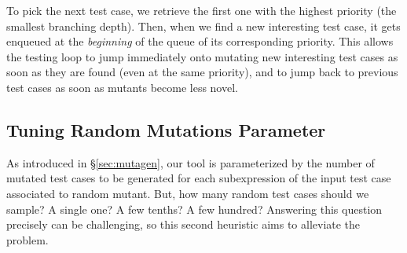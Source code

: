 \documentclass[sigconf,review,anonymous]{acmart}
\newcommand{\mutagen}{\textsc{Mutagen}\xspace}
\begin{document}
To pick the next test case, we retrieve the first one with the highest priority
(the smallest branching depth).
%
Then, when we find a new interesting test case, it gets enqueued at the
\emph{beginning} of the queue of its corresponding priority.
%
This allows the testing loop to jump immediately onto mutating new interesting
test cases as soon as they are found (even at the same priority), and to jump
back to previous test cases as soon as mutants become less novel.




\subsection{Tuning Random Mutations Parameter}

As introduced in \S \ref{sec:mutagen}, our tool is parameterized by the number
of mutated test cases to be generated for each subexpression of the input test
case associated to random mutant.
%
But, how many random test cases should we sample? A single one? A few tenths? A
few hundred?
%
Answering this question precisely can be challenging, so this second heuristic
aims to alleviate the problem.
\end{document}
